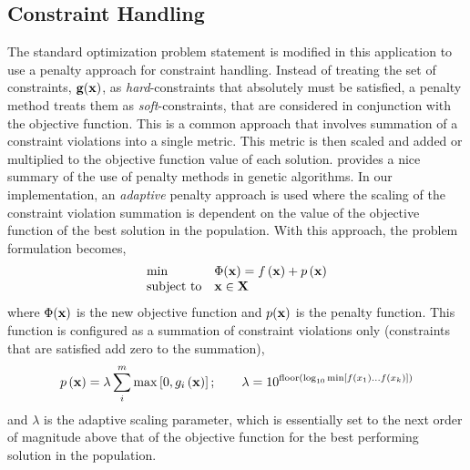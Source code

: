 \subsection{Constraint Handling}
The standard optimization problem statement is modified in this
application to use a penalty approach for constraint handling.  Instead
of treating the set of constraints, $\mathbf{g}(\mathbf{x})$, as
\textit{hard}-constraints that absolutely must be satisfied, a penalty
method treats them as \textit{soft}-constraints, that are considered in
conjunction with the objective function.  This is a common approach that
involves summation of a constraint violations into a single metric.
This metric is then scaled and added or multiplied to the objective
function value of each solution.  \citet{yeniay05} provides a nice
summary of the use of penalty methods in genetic algorithms.  In our
implementation, an \textit{adaptive} penalty approach is used where the
scaling of the constraint violation summation is dependent on the value
of the objective function of the best solution in the population.  With
this approach, the problem formulation becomes,
\begin{equation}
\begin{array}{ll}
  \min & \Phi(\mathbf{x}) = f\left(\mathbf{x}\right) + p\left(\mathbf{x}\right)\\
  \text{subject to}& \mathbf{x} \in \mathbf{X}\\
  \end{array}
\end{equation}
where $\Phi(\mathbf{x})$ is the new objective function and $p(\mathbf{x})$ is
the penalty function.  This function is configured as a summation of
constraint violations only (constraints that are satisfied add zero to the summation),
\begin{equation}
p\left(\mathbf{x}\right) = \lambda \sum_i^m \max\left[0,g_i
  \left(\mathbf{x}\right)\right];
\qquad \lambda = 10^{\text{floor} \left( \log_{10} \min\left[f\left(x_1\right)
  \ldots f\left(x_k\right) \right] \right)}
\end{equation}
and $\lambda$ is the adaptive scaling parameter, which is essentially
set to the next order of magnitude above that of the objective function
for the best performing solution in the population.


